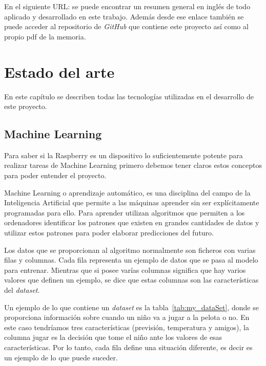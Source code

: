 \documentclass[a4paper, 12pt]{book}
\begin{document}
En el siguiente URL: se puede encontrar un resumen general en inglés de todo aplicado y desarrollado en este trabajo. Además desde ese enlace también se puede acceder al repositorio de \textit{GitHub} que contiene este proyecto así como al propio pdf de la memoria.

\cleardoublepage


\chapter{Estado del arte}               %
\label{chap:tecnologias}

En este capítulo se describen todas las tecnologías utilizadas en el desarrollo de este proyecto.

\section{Machine Learning}
\label{sec:machine_learning}

Para saber si la Raspberry es un dispositivo lo suficientemente potente para realizar tareas de Machine Learning primero debemos tener claros estos conceptos para poder entender el proyecto.

 Machine Learning o aprendizaje automático, es una disciplina del campo de la Inteligencia Artificial que permite a las máquinas aprender sin ser explícitamente programadas para ello. Para aprender utilizan algoritmos que permiten a los ordenadores identificar los patrones que existen en grandes cantidades de datos y utilizar estos patrones para poder elaborar predicciones del futuro. 
 
 Los datos que se proporcionan al algoritmo normalmente son ficheros con varias filas y columnas. Cada fila representa un ejemplo de datos que se pasa al modelo para entrenar. Mientras que si posee varías columnas significa que hay varios valores que definen un ejemplo, se dice que estas columnas son las características del \textit{dataset}. 
 
 Un ejemplo de lo que contiene un \textit{dataset} es la tabla~\ref{tab:my_dataSet}, donde se proporciona información sobre cuando un niño va a jugar a la pelota o no. En este caso tendríamos tres características (previsión, temperatura y amigos), la columna jugar es la decisión que tome el niño ante los valores de esas características. Por lo tanto, cada fila define una situación diferente, es decir es un ejemplo de lo que puede suceder.
 
\end{document}
